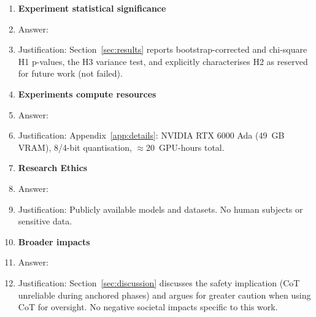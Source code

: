 \documentclass{article}
\begin{document}
\begin{enumerate}
\item \textbf{Experiment statistical significance}
  \item[] Answer: \answerYes{}
  \item[] Justification: Section~\ref{sec:results} reports
  bootstrap-corrected and chi-square H1 p-values, the H3 variance
  test, and explicitly characterises H2 as reserved for future
  work (not failed).

\item \textbf{Experiments compute resources}
  \item[] Answer: \answerYes{}
  \item[] Justification: Appendix~\ref{app:details}: NVIDIA RTX
  6000 Ada (49~GB VRAM), 8/4-bit quantisation,
  $\approx$20~GPU-hours total.

\item \textbf{Research Ethics}
  \item[] Answer: \answerYes{}
  \item[] Justification: Publicly available models and datasets.
  No human subjects or sensitive data.

\item \textbf{Broader impacts}
  \item[] Answer: \answerYes{}
  \item[] Justification: Section~\ref{sec:discussion} discusses the
  safety implication (CoT unreliable during anchored phases) and
  argues for greater caution when using CoT for oversight.
  No negative societal impacts specific to this work.

\end{enumerate}
\end{document}
